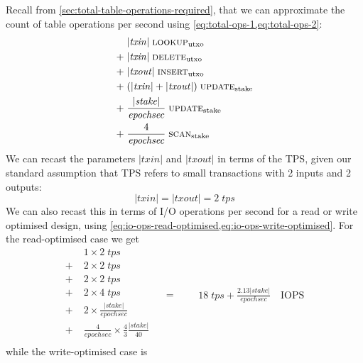 \documentclass[11pt,a4paper]{article}
\begin{document}
Recall from \cref{sec:total-table-operations-required}, that we can approximate
the count of table operations per second using
\cref{eq:total-ops-1,eq:total-ops-2}:
\begin{equation*}
\begin{aligned}
       & |\mathit{txin}| \; \text{{\sc lookup}}_\text{utxo} \\
  + \; & |\mathit{txin}| \; \text{{\sc delete}}_\text{utxo} \\
  + \; & |\mathit{txout}| \; \text{{\sc insert}}_\text{utxo} \\
  + \; & (|\mathit{txin}| + |\mathit{txout}|) \; \text{{\sc update}}_\text{stake} \\
  + \; & \frac{|\mathit{stake}|}{\mathit{epochsec}} \; \text{{\sc update}}_\text{stake} \\
  + \; & \frac{4}{\mathit{epochsec}} \;  \text{{\sc scan}}_\text{stake} \\
\end{aligned}
\end{equation*}
We can recast the parameters $|\mathit{txin}|$ and $|\mathit{txout}|$ in terms
of the TPS, given our standard assumption that TPS refers to small transactions
with 2 inputs and 2 outputs:
\[
|\mathit{txin}| = |\mathit{txout}| = 2 \; \mathit{tps}
\]
We can also recast this in terms of I/O operations per second for a read or
write optimised design, using
\cref{eq:io-ops-read-optimised,eq:io-ops-write-optimised}.
For the read-optimised case we get
\begin{equation}
\begin{aligned}
       & 1 \times 2 \; \mathit{tps} \\
  + \; & 2 \times 2 \; \mathit{tps} \\
  + \; & 2 \times 2 \; \mathit{tps} \\
  + \; & 2 \times 4 \; \mathit{tps} \\
  + \; & 2 \times   \frac{|\mathit{stake}|}{\mathit{epochsec}} \\
  + \; & \frac{4}{\mathit{epochsec}} \times \frac{4}{3} \frac{|\mathit{stake}|}{40} \\
\end{aligned}
\quad = \quad
\begin{aligned}
      & 18 \; \mathit{tps} + \frac{2.13 |stake|}{\mathit{epochsec}} \quad\text{IOPS}
\end{aligned}
\end{equation}
while the write-optimised case is
\end{document}
